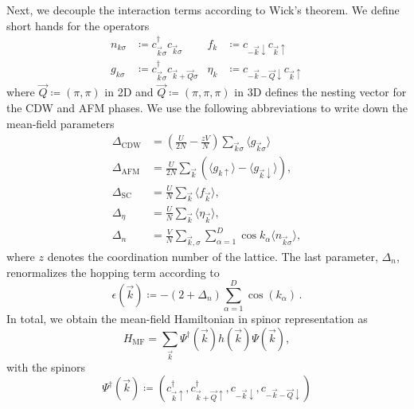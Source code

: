 \documentclass[
    reprint, 
    aps,
    preprintnumbers,
    twocolumn,
    prb,
    superscriptaddress
]{revtex4-2}
\newcommand{\vk}{\vec{k}}
\newcommand{\vQ}{\vec{Q}}
\newcommand{\up}{\uparrow}
\newcommand{\down}{\downarrow}
\newcommand{\kplusQ}{\vk+\vQ}
\newcommand{\kminusQ}{-\vk-\vQ}
\newcommand{\bs}{\begin{subequations}}
\newcommand{\es}{\end{subequations}}
\begin{document}
Next, we decouple the interaction terms according to Wick's theorem.
We define short hands for the operators
\bs
\begin{align}
    \label{eqn:operators}
        n_{k\sigma} &\coloneqq  c_{\vk\sigma}^\dagger c_{\vk\sigma}      &f_k     &\coloneqq  c_{-\vk\down} c_{\vk\up} \\
        g_{k\sigma} &\coloneqq  c_{\vk\sigma}^\dagger c_{\vk+\vQ\sigma}  &\eta_k  &\coloneqq  c_{-\vk-\vQ\down} c_{\vk\up}
\end{align}
\es
where $\vQ \coloneqq  (\pi, \pi)$ in 2D and $\vQ \coloneqq  (\pi, \pi,\pi)$ in 3D
defines the nesting vector for the CDW and AFM phases. We use the following abbreviations to write down the mean-field parameters
\begin{subequations}
    \begin{align}
        \label{eqn:delta_cdw}
        \Delta_\text{CDW} &= \left(\frac{U}{2N} - 
				\frac{zV}{N}\right) \sum_{\vk\sigma} \langle g_{\vk\sigma} \rangle \\
        \label{eqn:delta_afm}
        \Delta_\text{AFM} &= \frac{U}{2N} \sum_{\vk} \left( \langle g_{k\uparrow} \rangle - \langle g_{\vk\downarrow} \rangle \right), \\
        \Delta_\text{SC} &= \frac{U}{N} \sum_{\vk} \langle f_{\vk} \rangle, \\
        \Delta_\eta &= \frac{U}{N} \sum_{\vk} \langle \eta_{\vk} \rangle, \\
        \Delta_n &= \frac{V}{N} \sum_{\vk,\sigma} \sum_{\alpha=1}^D \cos k_\alpha \langle n_{\vk\sigma} \rangle,
    \end{align}
\end{subequations}
where $z$ denotes the coordination number of the lattice.
The last parameter, $\Delta_n$, renormalizes the hopping term according to 
\begin{equation}
    \epsilon( \vk ) \coloneqq  -(2 + \Delta_n) \sum_{\alpha=1}^D \cos(k_\alpha)\,.
\end{equation}
In total, we obtain the mean-field Hamiltonian in spinor representation as
\begin{equation}
    \label{eqn:mf_hamiltonian}
    H_\text{MF} = \sum_{\vk} \Psi^\dagger (\vk) h(\vk) \Psi (\vk),
\end{equation}
with the spinors
\begin{equation}
    \Psi^\dagger (\vk) \coloneqq  \left( c_{\vk\up}^\dagger, c_{\kplusQ\up}^\dagger, c_{-\vk\down}, c_{\kminusQ\down} \right)
\end{equation}
\end{document}
